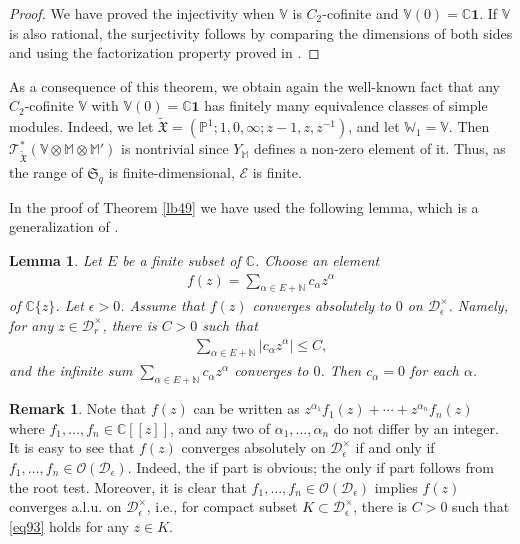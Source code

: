 \documentclass[12pt,a4paper,notitlepage]{article}
\theoremstyle{definition}
\newtheorem{rem}[df]{Remark}
\theoremstyle{plain}
\newtheorem{lm}[df]{Lemma}
\newcommand{\fk}{\mathfrak}
\newcommand{\mc}{\mathcal}
\newcommand{\wtd}{\widetilde}
\newcommand{\id}{\mathbf{1}}
\newcommand{\scr}{\mathscr}
\newcommand{\Vbb}{\mathbb V}
\newcommand{\Wbb}{\mathbb W}
\newcommand{\Mbb}{\mathbb M}
\newcommand{\Cbb}{\mathbb C}
\newcommand{\Nbb}{\mathbb N}
\newcommand{\Pbb}{\mathbb P}
\numberwithin{equation}{section}
\begin{document}
\begin{proof}
We have proved the injectivity when $\Vbb$ is $C_2$-cofinite and $\Vbb(0)=\Cbb\id$. If $\Vbb$ is also rational, the surjectivity follows by comparing the dimensions of both sides and using the factorization property proved in \cite{DGT19b}.
\end{proof}


As a consequence of this theorem, we obtain again the well-known fact that any $C_2$-cofinite $\Vbb$ with $\Vbb(0)=\Cbb\id$ has finitely many equivalence classes of simple modules. Indeed, we let $\wtd{\fk X}=(\Pbb^1;1,0,\infty;z-1,z,z^{-1})$, and let $\Wbb_1=\Vbb$. Then $\scr T_{\wtd{\fk X}}^*(\Vbb\otimes\Mbb\otimes\Mbb')$ is nontrivial since $Y_\Mbb$ defines a non-zero element of it. Thus, as the range of $\fk S_q$ is finite-dimensional, $\mc E$ is finite.

In the proof of Theorem \ref{lb49} we have used the following lemma, which is a generalization of \cite[Lemma 14.5]{Hua95}. 

\begin{lm}\label{lb50}
	Let $E$ be a finite subset of $\Cbb$. Choose an element
	\begin{align*}
	f(z)=\sum_{\alpha\in E+\Nbb}c_\alpha z^\alpha
	\end{align*}
	of $\Cbb\{z\}$. Let $\epsilon>0$. Assume that $f(z)$ converges absolutely to $0$ on $\mc D_\epsilon^\times$. Namely, for any  $z\in\mc D_r^\times$, there is $C>0$ such that
	\begin{align}
	\sum_{\alpha\in E+\Nbb}|c_\alpha z^\alpha|\leq C,\label{eq93}
	\end{align} 
	and the infinite sum $\sum_{\alpha\in E+\Nbb}c_\alpha z^\alpha$ converges to $0$. Then $c_\alpha=0$ for each $\alpha$.
\end{lm}

\begin{rem}\label{lb51}
	Note that $f(z)$ can be written as $z^{\alpha_1}f_1(z)+\cdots+z^{\alpha_n}f_n(z)$ where $f_1,\dots,f_n\in\Cbb[[z]]$, and any two of $\alpha_1,\dots,\alpha_n$ do not differ by an integer. It is easy to see that $f(z)$ converges absolutely on $\mc D_\epsilon^\times$ if and only if $f_1,\dots,f_n\in\scr O(\mc D_\epsilon)$. Indeed, the if part is obvious; the only if part follows from the root test. Moreover, it is clear  that $f_1,\dots,f_n\in\scr O(\mc D_\epsilon)$ implies  $f(z)$ converges a.l.u. on $\mc D_\epsilon^\times$, i.e., for compact subset $K\subset\mc D_\epsilon^\times$, there is $C>0$ such that \eqref{eq93} holds for any $z\in K$.
\end{rem}
\end{document}
